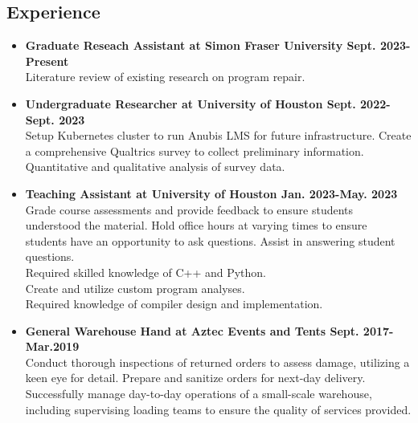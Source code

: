 \documentclass[12pt]{article}
\begin{document}
    \subsection*{Experience}
    \begin{itemize}[leftmargin=0em]
        \item[] \textbf{Graduate Reseach Assistant at Simon Fraser University \hfill Sept. 2023-Present} \\
        Literature review of existing research on program repair.

        \item[] \textbf{Undergraduate Researcher at University of Houston \hfill Sept. 2022-Sept. 2023} \\
        Setup Kubernetes cluster to run Anubis LMS for future infrastructure.
        Create a comprehensive Qualtrics survey to collect preliminary information.
        Quantitative and qualitative analysis of survey data.

        \item[] \textbf{Teaching Assistant at University of Houston \hfill Jan.  2023-May. 2023} \\
        Grade course assessments and provide feedback to ensure students understood the material.
        Hold office hours at varying times to ensure students have an opportunity to ask questions.
        Assist in answering student questions.\\
        Required skilled knowledge of C++ and Python.\\
        Create and utilize custom program analyses.\\
        Required knowledge of compiler design and implementation.

        \item[] \textbf{General Warehouse Hand at Aztec Events and Tents \hfill Sept. 2017-Mar.2019} \\
        Conduct thorough inspections of returned orders to assess damage, utilizing a keen eye for detail.
        Prepare and sanitize orders for next-day delivery.
        Successfully manage day-to-day operations of a small-scale warehouse, including supervising loading teams to ensure the quality of services provided.
    \end{itemize}


    
    
\end{document}
